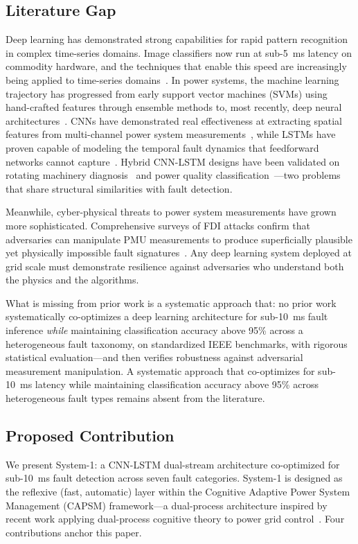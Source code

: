 \documentclass[journal]{IEEEtran}
\begin{document}
\subsection{Literature Gap}

Deep learning has demonstrated strong capabilities for rapid pattern recognition in complex time-series domains. Image classifiers now run at sub-5~ms latency on commodity hardware, and the techniques that enable this speed are increasingly being applied to time-series domains~\cite{ref6}. In power systems, the machine learning trajectory has progressed from early support vector machines (SVMs) using hand-crafted features through ensemble methods to, most recently, deep neural architectures~\cite{ref7,ref8}. CNNs have demonstrated real effectiveness at extracting spatial features from multi-channel power system measurements~\cite{ref9}, while LSTMs have proven capable of modeling the temporal fault dynamics that feedforward networks cannot capture~\cite{ref10}. Hybrid CNN-LSTM designs have been validated on rotating machinery diagnosis~\cite{ref11} and power quality classification~\cite{ref12}---two problems that share structural similarities with fault detection.

Meanwhile, cyber-physical threats to power system measurements have grown more sophisticated. Comprehensive surveys of FDI attacks confirm that adversaries can manipulate PMU measurements to produce superficially plausible yet physically impossible fault signatures~\cite{ref13,ref14}. Any deep learning system deployed at grid scale must demonstrate resilience against adversaries who understand both the physics and the algorithms.

What is missing from prior work is a systematic approach that: no prior work systematically co-optimizes a deep learning architecture for sub-10~ms fault inference \emph{while} maintaining classification accuracy above 95\% across a heterogeneous fault taxonomy, on standardized IEEE benchmarks, with rigorous statistical evaluation---and then verifies robustness against adversarial measurement manipulation. A systematic approach that co-optimizes for sub-10~ms latency while maintaining classification accuracy above 95\% across heterogeneous fault types remains absent from the literature.

\subsection{Proposed Contribution}

We present System-1: a CNN-LSTM dual-stream architecture co-optimized for sub-10~ms fault detection across seven fault categories. System-1 is designed as the reflexive (fast, automatic) layer within the Cognitive Adaptive Power System Management (CAPSM) framework---a dual-process architecture inspired by recent work applying dual-process cognitive theory to power grid control~\cite{ref15}. Four contributions anchor this paper.
\end{document}
